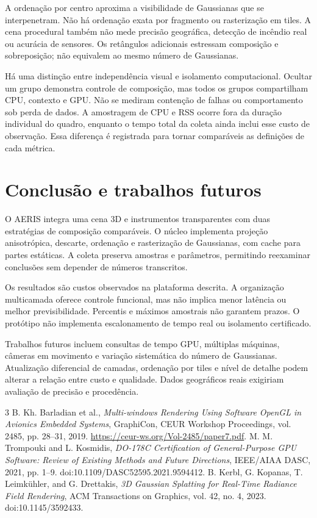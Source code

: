 \documentclass[conference]{IEEEtran}
\begin{document}
A ordenação por centro aproxima a visibilidade de Gaussianas que se interpenetram. Não há ordenação exata por fragmento ou rasterização em tiles. A cena procedural também não mede precisão geográfica, detecção de incêndio real ou acurácia de sensores. Os retângulos adicionais estressam composição e sobreposição; não equivalem ao mesmo número de Gaussianas.

Há uma distinção entre independência visual e isolamento computacional. Ocultar um grupo demonstra controle de composição, mas todos os grupos compartilham CPU, contexto e GPU. Não se mediram contenção de falhas ou comportamento sob perda de dados. A amostragem de CPU e RSS ocorre fora da duração individual do quadro, enquanto o tempo total da coleta ainda inclui esse custo de observação. Essa diferença é registrada para tornar comparáveis as definições de cada métrica.

\section{Conclusão e trabalhos futuros}
O AERIS integra uma cena 3D e instrumentos transparentes com duas estratégias de composição comparáveis. O núcleo implementa projeção anisotrópica, descarte, ordenação e rasterização de Gaussianas, com cache para partes estáticas. A coleta preserva amostras e parâmetros, permitindo reexaminar conclusões sem depender de números transcritos.

Os resultados são custos observados na plataforma descrita. A organização multicamada oferece controle funcional, mas não implica menor latência ou melhor previsibilidade. Percentis e máximos amostrais não garantem prazos. O protótipo não implementa escalonamento de tempo real ou isolamento certificado.

Trabalhos futuros incluem consultas de tempo GPU, múltiplas máquinas, câmeras em movimento e variação sistemática do número de Gaussianas. Atualização diferencial de camadas, ordenação por tiles e nível de detalhe podem alterar a relação entre custo e qualidade. Dados geográficos reais exigiriam avaliação de precisão e procedência.

\begin{thebibliography}{3}
B. Kh. Barladian et al., \emph{Multi-windows Rendering Using Software OpenGL in Avionics Embedded Systems}, GraphiCon, CEUR Workshop Proceedings, vol. 2485, pp. 28--31, 2019. \url{https://ceur-ws.org/Vol-2485/paper7.pdf}.
M. M. Trompouki and L. Kosmidis, \emph{DO-178C Certification of General-Purpose GPU Software: Review of Existing Methods and Future Directions}, IEEE/AIAA DASC, 2021, pp. 1--9. doi:10.1109/DASC52595.2021.9594412.
B. Kerbl, G. Kopanas, T. Leimkühler, and G. Drettakis, \emph{3D Gaussian Splatting for Real-Time Radiance Field Rendering}, ACM Transactions on Graphics, vol. 42, no. 4, 2023. doi:10.1145/3592433.
\end{thebibliography}
\end{document}
